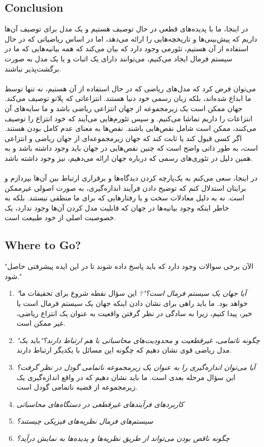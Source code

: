 \documentclass[10pt,a4paper]{article}
\begin{document}
    \subsection{Conclusion}
در اینجا، ما با پدیده‌های قطعی در حال توصیف هستیم و یک مدل برای توصیف آن‌ها داریم که پیش‌بینی‌ها و تاریخچه‌هایی را ارائه می‌دهد، اما در اساس ریاضیاتی که در حال استفاده از آن هستیم، تئورمی وجود دارد که بیان می‌کند که همه بیانیه‌هایی که ما در سیستم فرمال ایجاد می‌کنیم، می‌توانند دارای یک اثبات و یا یک مدل به صورت برگشت‌پذیر نباشند.
        \\
        \\
می‌توان فرض کرد که مدل‌های ریاضی که در حال استفاده از آن هستیم، نه تنها توسط ما ابداع شده‌اند، بلکه زبان رسمی خود دنیا هستند. انتزاعاتی که پلاتو توصیف می‌کند. جهان ممکن است یک زیرمجموعه از جهان انتزاعی ریاضی باشد و ما سایه‌های آن انتزاعات را داریم تماشا می‌کنیم. و سپس تئورم‌هایی می‌آیند که خود انتزاع را توصیف می‌کنند، ممکن است شامل نقص‌هایی باشند. نقص‌ها به معنای عدم کامل بودن هستند. اگر کسی قبول کند یا ثابت کند که جهان زیرمجموعه‌ای از جهان ریاضی و انتزاعی است، به طور ذاتی واضح است که چنین نقص‌هایی در جهان باید وجود داشته باشد و به همین دلیل در تئوری‌های رسمی که درباره جهان ارائه می‌دهیم، نیز وجود داشته باشد.
        \\
        \\
در اینجا، سعی می‌کنم به یک‌پارچه کردن دیدگاه‌ها و برقراری ارتباط بین آن‌ها بپردازم و برایتان استدلال کنم که توضیح دادن فرآیند اندازه‌گیری، به صورت اصولی غیرممکن است. نه به دلیل معادلات سخت و یا رفتارهایی که برای ما منطقی نیستند. بلکه به خاطر اینکه وجود بیانیه‌ها در جهان که قابلیت مدل کردن آن‌ها وجود ندارد، یک خصوصیت اصلی از خود طبیعت است.
        \subsection{Where to Go?}
"الآن برخی سوالات وجود دارد که باید پاسخ داده شوند تا در این ایده پیشرفتی حاصل شود."
        \begin{enumerate}
            \item \textit{"آیا جهان یک سیستم فرمال است؟"?} این سؤال نقطه شروع برای تحقیقات ما خواهد بود. ما باید راهی برای نشان دادن اینکه جهان یک سیستم فرمال است یا خیر، پیدا کنیم، زیرا به سادگی در نظر گرفتن واقعیت به عنوان یک انتزاع ریاضی، غیر ممکن است.
            \item \textit{"چگونه ناتمامی، غیرقطعیت و محدودیت‌های محاسباتی با هم ارتباط دارند؟"}باید یک مدل ریاضی قوی نشان دهیم که چگونه این مسائل با یکدیگر ارتباط دارند.
            \item \textit{آیا می‌توان اندازه‌گیری را به عنوان یک زیرمجموعه ناتمامی گودل در نظر گرفت؟} این سؤال مرحله بعدی است. ما باید نشان دهیم که در واقع اندازه‌گیری یک زیرمجموعه از قضیه ناتمامی گودل است.
            \item \textit{کاربردهای فرآیندهای غیرقطعی در دستگاه‌های محاسباتی}
            \item \textit{سیستم‌های فرمال نظریه‌های فیزیکی چیستند؟}
            \item \textit{چگونه ناقص بودن می‌تواند از طریق نظریه‌ها و پدیده‌ها به نمایش درآید؟}
        \end{enumerate}            
                \newpage
                    
                    
            
\end{document}
